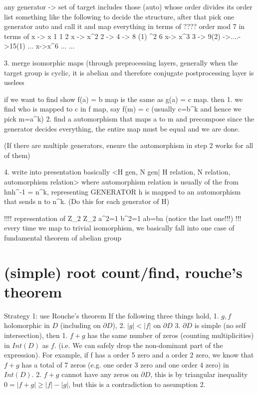     any generator -> set of target includes those (auto) whose order divides its order
    list something like the following to decide the structure, after that pick one generator auto and call it \alpha and map everything in terms of \alpha????
 order                       mod 7                          in terms of          x -> x      1                                      1
  2          x -> x^2    2 -> 4 -> 8 (1)                        \alpha^2
  6          x-> x^3    3 -> 9(2) ->....->15(1)                \alpha  
            ...
            x->x^6          ...                                 ...



3. merge isomorphic maps (through preprocessing layers, generally when the target group is cyclic, it is abelian and therefore conjugate postprocessing layer is useless

    if we want to find show f(a) = b map is the same as g(a) = c map. then 
    1. we find who is mapped to c in f map, say f(m) = c (usually c=b^k and hence we pick m=a^k)
    2. find a automorphism that maps a to m and precompose
        since the generator decides everything, the entire map must be equal and we are done.
                
    (If there are multiple generators, ensure the automorphism in step 2 works for all of them)        

4. write into presentation
    basically <H gen, N gen| H relation, N relation, automorphism relation>
    where automorphism relation is usually of the from hnh^{-1} = n^k, representing GENERATOR h is mapped to an automorphism that sends n to n^k. (Do this for each generator of H)
    
    !!!! representation of Z_2 \times Z_2 a^2=1 b^2=1 ab=ba (notice the last one!!!)
    !!! every time we map to trivial isomorphism, we basically fall into one case of fundamental theorem of abelian group




\section*{(simple) root count/find, rouche's theorem}

Strategy 1: use Rouche's theorem 
    If the following three things hold, 
        1. $g,f$ holomorphic in $D$ (including on $\partial D$), 
        2. $|g| < |f|$ on $\partial D$
        3. $\partial D$ is simple (no self intersection), 
    then
    	1. $f+g$ has the same number of zeros (counting multiplicities) in $Int(D)$ as $f$. (i.e. We can safely drop the non-dominant part of the expression). For example, if f has a order 5 zero and a order 2 zero, we know that $f+g$ has a total of 7 zeros (e.g. one order 3 zero and one order 4 zero) in $Int(D)$.
    	2. $f+g$ cannot have any zeros on $\partial D$, this is by triangular inequality $0 = |f+g| \geq |f| - |g|$, but this is a contradiction to assumption 2.
    

